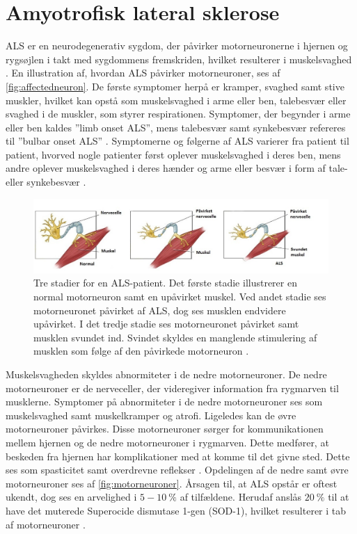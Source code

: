 \section{Amyotrofisk lateral sklerose} \label{sec:ALS}
ALS er en neurodegenerativ sygdom, der påvirker motorneuronerne i hjernen og rygsøjlen i takt med sygdommens fremskriden, hvilket resulterer i muskelsvaghed \citep{henschke2012}. En illustration af, hvordan ALS påvirker motorneuroner, ses af \autoref{fig:affectedneuron}. De første symptomer herpå er kramper, svaghed samt stive muskler, hvilket kan opstå som muskelsvaghed i arme eller ben, talebesvær eller svaghed i de muskler, som styrer respirationen. Symptomer, der begynder i arme eller ben kaldes ”limb onset ALS”, mens talebesvær samt synkebesvær refereres til ”bulbar onset ALS” \citep{nationalinstitute2016}. 
Symptomerne og følgerne af ALS varierer fra patient til patient, hvorved nogle patienter først oplever muskelsvaghed i deres ben, mens andre oplever muskelsvaghed i deres hænder og arme eller besvær i form af tale- eller synkebesvær \citep{miller2005, nationalinstitute2016}.

\begin{figure}[H]
\centering
\includegraphics[width=1\textwidth]{figures/affectedneuron}
\caption{Tre stadier for en ALS-patient. Det første stadie illustrerer en normal motorneuron samt en upåvirket muskel. Ved andet stadie ses motorneuronet påvirket af ALS, dog ses musklen endvidere upåvirket. I det tredje stadie ses motorneuronet påvirket samt musklen svundet ind. Svindet skyldes en manglende stimulering af musklen som følge af den påvirkede motorneuron \citep{drake2015}.}
\label{fig:affectedneuron}
\end{figure}
 
\noindent
Muskelsvagheden skyldes abnormiteter i de nedre motorneuroner. De nedre motorneuroner er de nerveceller, der videregiver information fra rygmarven til musklerne. Symptomer på abnormiteter i de nedre motorneuroner ses som muskelsvaghed samt muskelkramper og atrofi.
Ligeledes kan de øvre motorneuroner påvirkes. Disse motorneuroner sørger for kommunikationen mellem hjernen og de nedre motorneuroner i rygmarven. Dette medfører, at beskeden fra hjernen har komplikationer med at komme til det givne sted. Dette ses som spasticitet samt overdrevne reflekser \citep{nationalinstitute2016}. Opdelingen af de nedre samt øvre motorneuroner ses af \autoref{fig:motorneuroner}.
Årsagen til, at ALS opstår er oftest ukendt, dog ses en arvelighed i $5 - 10~\%$ af tilfældene. Herudaf anslås $20~\%$ til at have det muterede Superocide dismutase 1-gen (SOD-1), hvilket resulterer i tab af motorneuroner \citep{miller2005}.

